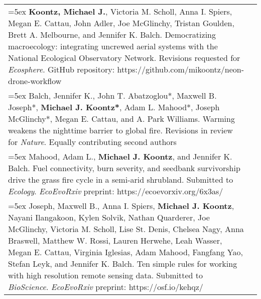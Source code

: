 \begin{longtable}{@{} >{\raggedright}p{6.25in} >{\raggedleft}X @{}}

\hangindent=5ex \textbf{Koontz, Michael J.}, Victoria M. Scholl, Anna I. Spiers, Megan E. Cattau, John Adler, Joe McGlinchy, Tristan Goulden, Brett A. Melbourne, and Jennifer K. Balch. Democratizing macroecology: integrating uncrewed aerial systems with the National Ecological Observatory Network. Revisions requested for \emph{Ecosphere}. 
\newline GitHub repository: https://github.com/mikoontz/neon-drone-workflow & \tabularnewline

\hangindent=5ex Balch, Jennifer K., John T. Abatzoglou*, Maxwell B. Joseph*, \textbf{Michael J. Koontz*}, Adam L. Mahood*, Joseph McGlinchy*, Megan E. Cattau, and A. Park Williams. Warming weakens the nighttime barrier to global fire. Revisions in review for \emph{Nature}. 
\newline *Equally contributing second authors & \tabularnewline

\hangindent=5ex Mahood, Adam L., \textbf{Michael J. Koontz}, and Jennifer K. Balch. Fuel connectivity, burn severity, and seedbank survivorship drive the grass fire cycle in a semi-arid shrubland. Submitted to \emph{Ecology}. 
\newline \emph{EcoEvoRxiv} preprint: https://ecoevorxiv.org/6x3as/ & \tabularnewline

\hangindent=5ex Joseph, Maxwell B., Anna I. Spiers, \textbf{Michael J. Koontz}, Nayani Ilangakoon, Kylen Solvik, Nathan Quarderer, Joe McGlinchy, Victoria M. Scholl, Lise St. Denis, Chelsea Nagy, Anna Braswell, Matthew W. Rossi, Lauren Herwehe, Leah Wasser, Megan E. Cattau, Virginia Iglesias, Adam Mahood, Fangfang Yao, Stefan Leyk, and Jennifer K. Balch. Ten simple rules for working with high resolution remote sensing data.  Submitted to \emph{BioScience}. 
\newline \emph{EcoEvoRxiv} preprint: https://osf.io/kehqz/ & \tabularnewline

\end{longtable}
